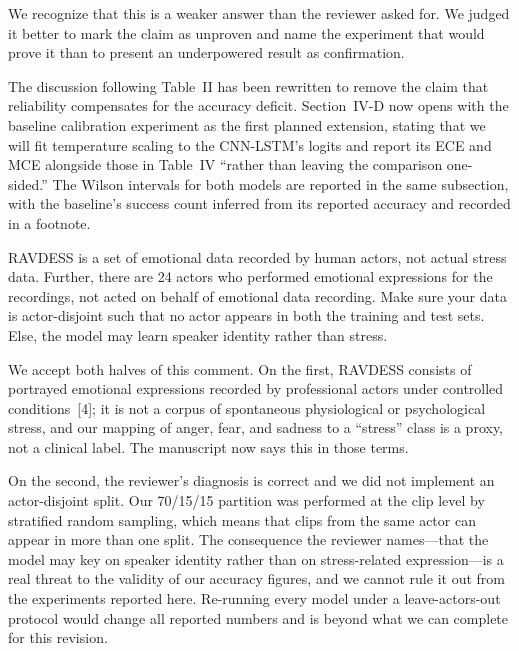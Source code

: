 We recognize that this is a weaker answer than the reviewer asked for. We
judged it better to mark the claim as unproven and name the experiment
that would prove it than to present an underpowered result as
confirmation.

\begin{changesblock}
The discussion following Table~II has been rewritten to remove
the claim that reliability compensates for the accuracy deficit.
Section~IV-D now opens with the baseline calibration experiment as the
first planned extension, stating that we will fit temperature scaling to
the CNN-LSTM's logits and report its ECE and MCE alongside those in
Table~IV ``rather than leaving the comparison one-sided.'' The Wilson
intervals for both models are reported in the same subsection, with the
baseline's success count inferred from its reported accuracy and recorded
in a footnote.
\end{changesblock}


\begin{reviewercomment}
RAVDESS is a set of emotional data recorded by human actors, not actual
stress data. Further, there are 24 actors who performed emotional
expressions for the recordings, not acted on behalf of emotional data
recording. Make sure your data is actor-disjoint such that no actor
appears in both the training and test sets. Else, the model may learn
speaker identity rather than stress.
\end{reviewercomment}

\response We accept both halves of this comment. On the first, RAVDESS
consists of portrayed emotional expressions recorded by professional
actors under controlled conditions~[4]; it is
not a corpus of spontaneous physiological or psychological stress, and
our mapping of anger, fear, and sadness to a ``stress'' class is a
proxy, not a clinical label. The manuscript now says this in those terms.

On the second, the reviewer's diagnosis is correct and we did not
implement an actor-disjoint split. Our 70/15/15 partition was performed
at the clip level by stratified random sampling, which means that clips
from the same actor can appear in more than one split. The consequence
the reviewer names---that the model may key on speaker identity rather
than on stress-related expression---is a real threat to the validity of
our accuracy figures, and we cannot rule it out from the experiments
reported here. Re-running every model under a leave-actors-out protocol
would change all reported numbers and is beyond what we can complete for
this revision.

